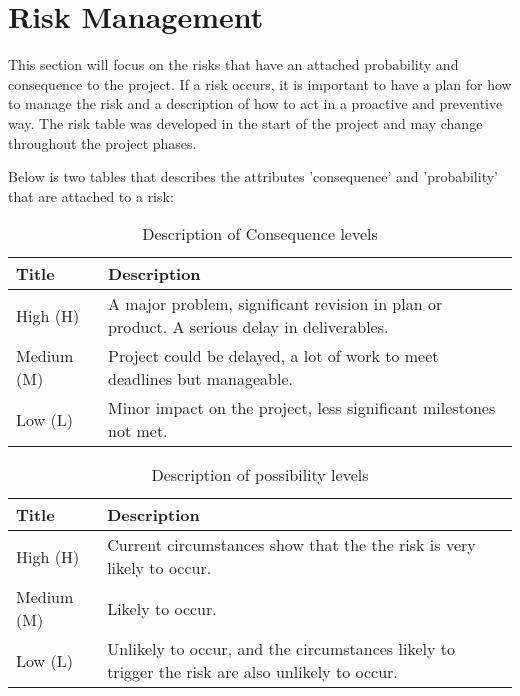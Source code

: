 
\clearpage

\section{Risk Management}

This section will focus on the risks that have an attached probability and consequence to the project. If a risk occurs, it is important to have a plan for how to manage the risk and a description of how to act in a proactive and preventive way. The risk table was developed in the start of the project and may change throughout the project phases.

Below is two tables that describes the attributes 'consequence' and 'probability' that are attached to a risk:


\begin{table}[H]
\begin{tabular}{| p{3cm} | p{8cm} |}
  \hline
  \rowcolor{gray}
  {\bf Title} & {\bf Description} \\ \hline
    High (H) & A major problem, significant revision in plan or product. 
    A serious delay in deliverables.\\ \hline
    Medium (M) & Project could be delayed, a lot of work to meet deadlines but
    manageable.\\ \hline
    Low (L) & Minor impact on the project, less significant milestones not met.\\ \hline
\end{tabular}
\caption{Description of Consequence levels}
\end{table}

\begin{table}[H]
\begin{tabular}{| p{3cm} | p{8cm} |}
  \hline
  \rowcolor{gray}
    {\bf Title} & {\bf Description} \\ \hline
    High (H) & Current circumstances show that the the risk is very 
    likely to occur.\\ \hline
    Medium (M) & Likely to occur.\\ \hline
    Low (L) & Unlikely to occur, and the circumstances likely to trigger 
    the risk are also unlikely to occur.\\ \hline
\end{tabular}
\caption{Description of possibility levels}
\end{table}

